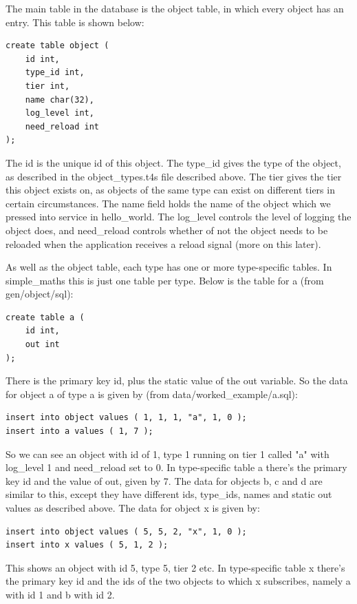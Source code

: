\documentclass{report}
\begin{document}
The main table in the database is the object table, in which every object has an entry. This table is shown below:
 
\begin{verbatim}
create table object (
    id int, 
    type_id int,
    tier int,
    name char(32),
    log_level int,
    need_reload int
);
\end{verbatim}

The id is the unique id of this object. The type_id gives the type of the object, as described in the object_types.t4s file described above. The tier gives the tier this object exists on, as objects of the same type can exist on different tiers in certain circumstances. The name field holds the name of the object which we pressed into service in hello_world. The log_level controls the level of logging the object does, and need_reload controls whether of not the object needs to be reloaded when the application receives a reload signal (more on this later).

As well as the object table, each type has one or more type-specific tables. In simple_maths this is just one table per type. Below is the table for a (from gen/object/sql):


\begin{verbatim}
create table a (
    id int,
    out int
);
\end{verbatim}

There is the primary key id, plus the static value of the out variable. So the data for object a of type a is given by (from data/worked_example/a.sql):

\begin{verbatim}
insert into object values ( 1, 1, 1, "a", 1, 0 );
insert into a values ( 1, 7 );
\end{verbatim}

So we can see an object with id of 1, type 1 running on tier 1 called "a" with log_level 1 and need_reload set to 0. In type-specific table a there's the primary key id and the value of out, given by 7. The data for objects b, c and d are similar to this, except they have different ids, type_ids, names and static out values as described above. The data for object x is given by:


\begin{verbatim}
insert into object values ( 5, 5, 2, "x", 1, 0 );
insert into x values ( 5, 1, 2 );
\end{verbatim}

This shows an object with id 5, type 5, tier 2 etc. In type-specific table x there's the primary key id and the ids of the two objects to which x subscribes, namely a with id 1 and b with id 2. 
\end{document}
